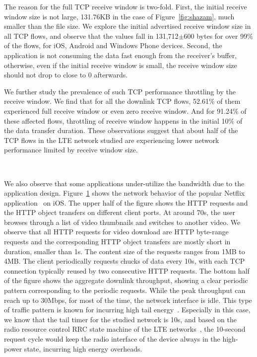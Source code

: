 The reason for the full TCP receive window is two-fold. First, the initial receive window size is not large, \eg 131.76KB in the case of Figure~\ref{fig:shazam}, much smaller than the file size. We explore the initial advertised receive window size in all TCP flows, and observe that the values fall in 131,712$\pm$600 bytes for over 99\% of the flows, for iOS, Android and Windows Phone devices. Second, the application is not consuming the data fast enough from the receiver's buffer, otherwise, even if the initial receive window is small, the receive window size should not drop to close to 0 afterwards.

We further study the prevalence of such TCP performance throttling by the receive window. We find that for all the downlink TCP flows, 52.61\% of them experienced full receive window or even zero receive window. And for 91.24\% of these affected flows, throttling of receive window happens in the initial 10\% of the data transfer duration. These observations suggest that about half of the TCP flows in the LTE network studied are experiencing lower network performance limited by receive window size.

\begin{figure}[t]
\centering
{}\\
\label{fig:netflix}
\end{figure}

We also observe that some applications under-utilize the bandwidth due to the application design. Figure~\ref{fig:netflix} shows the network behavior of the popular Netflix application~\cite{netflix} on iOS. The upper half of the figure shows the HTTP requests and the HTTP object transfers on different client ports. At around 70s, the user browses through a list of video thumbnails and switches to another video. We observe that all HTTP requests for video download are HTTP byte-range requests and the corresponding HTTP object transfers are mostly short in duration, \ie smaller than 1s. The content size of the requests ranges from 1MB to 4MB. The client periodically requests chucks of data every 10s, with each TCP connection typically reused by two consecutive HTTP requests. The bottom half of the figure shows the aggregate downlink throughput, showing a clear periodic pattern corresponding to the periodic requests. While the peak throughput can reach up to 30Mbps, for most of the time, the network interface is idle. This type of traffic pattern is known for incurring high tail energy~\cite{qian12_www}. Especially in this case, we know that the tail timer for the studied network is 10s, and based on the radio resource control RRC state machine of the LTE networks~\cite{huang_mobisys12}, the 10-second request cycle would keep the radio interface of the device always in the high-power state, incurring high energy overheads.

